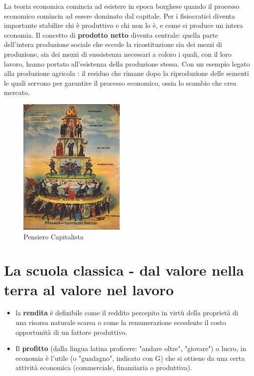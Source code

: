\documentclass{article}
\begin{document}
La teoria economica comincia ad esistere in epoca borghese quando
il processo economico comincia ad essere dominato dal capitale. 
Per i fisiocratici diventa importante stabilire chi è produttivo e chi non lo è, e come si produce un intera economia.
Il concetto di \textbf{prodotto netto} diventa centrale: quella parte dell’intera
produzione sociale che eccede la ricostituzione sia dei mezzi di produzione, sia
dei mezzi di sussistenza necessari a coloro i quali, con il loro lavoro, hanno
portato all’esistenza della produzione stessa.
Con un esempio legato alla produzione agricola : il residuo che rimane dopo la riproduzione delle sementi le quali servono per garantire il processo economico, ossia lo scambio che crea mercato.



\begin{figure}[h!]
\centering
\includegraphics[scale=1.0]{images/fisiocratici.jpeg}
\caption{Pensiero Capitalista}
\label{fig:cap}
\end{figure}


\section{La scuola classica - dal valore nella terra al valore nel lavoro}
\begin{itemize}
    \item  la \textbf{rendita} è definibile come il reddito percepito in virtù della proprietà di una risorsa naturale scarsa o come la remunerazione eccedente il costo opportunità di un fattore produttivo.
    \item Il \textbf{profitto} (dalla lingua latina proficere: "andare oltre", "giovare") o lucro, in economia è l'utile (o "guadagno", indicato con G) che si ottiene da una certa attività economica (commerciale, finanziaria o produttiva).
\end{itemize}
\end{document}
